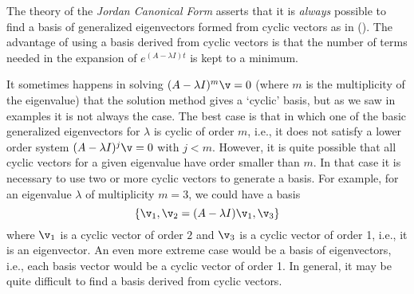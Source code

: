  The theory of the {\it Jordan
Canonical Form\/} asserts that it is {\it always\/} possible to
find a basis of generalized eigenvectors formed from cyclic vectors 
%
as in (\eqn).   The advantage of using a basis derived from cyclic
vectors is that the number of terms needed in the expansion of
$e^{(A - \lambda I)t}$ is kept to a minimum. 

It sometimes happens in solving $(A - \lambda I)^m\v = 0$ (where
$m$ is the multiplicity of the eigenvalue) that
the solution method gives  a `cyclic' basis, but as we saw in
examples it is not always the case.  The best case is
that in which one of the basic
generalized eigenvectors for $\lambda$ is cyclic of order $m$,
i.e., it
 does not satisfy
a lower order system
  $(A - \lambda I)^j\v = 0$ with $j < m$.  
 However, it is quite possible
that all cyclic vectors for a given
eigenvalue have order smaller than $m$.  In that case
it is necessary to use two or more cyclic vectors to generate
a basis.
  For example, for an eigenvalue $\lambda$ of multiplicity $m = 3$,
 we could have
a basis 
$$
\{\v_1, \v_2 = (A - \lambda I)\v_1, \v_3\}
$$
where $\v_1$ is a cyclic vector of order $2$ and $\v_3$ is
a cyclic vector of order 1, i.e., it is an eigenvector.
An even more extreme case would be a basis of eigenvectors,
i.e., each basis vector would be a cyclic vector of
order 1.  In general, it may be quite difficult to find
a basis derived from cyclic vectors.
\bigskip

\bigskip

\endchapter
{}
\enddocument
